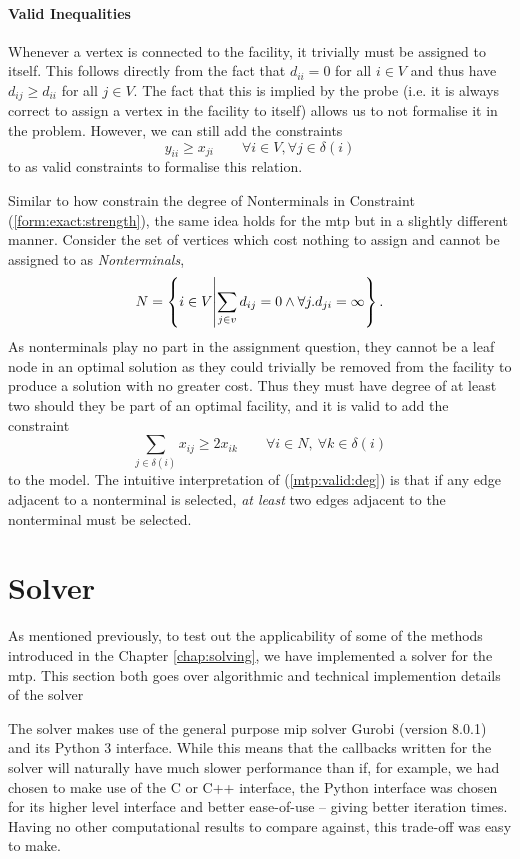  \paragraph{Valid Inequalities}
 Whenever a vertex is connected to the facility, it trivially must be assigned to itself. This
 follows directly from the fact that $d_{ii} = 0$ for all $i \in V$ and thus have $d_{ij} \geq d_{ii}$
 for all $j \in V$. The fact that this is implied by the probe (i.e. it is always correct to assign a
 vertex in the facility to itself) allows us to not formalise it in the problem. However, we can
 still add the constraints
 \begin{equation}\label{form:mtp:str}
 y_{ii} \geq x_{ji} \qquad \forall i \in V,  \forall j \in \delta(i)
\end{equation}
 to as valid constraints to formalise this relation.

 Similar to how \citeauthor{ljubic2005solving} constrain the degree of Nonterminals in Constraint
 (\ref{form:exact:strength}), the same idea holds for the \gls{mtp} but in a slightly different manner.
 Consider the set of vertices which cost nothing to assign and cannot be assigned to as \textit{Nonterminals},
 $$N = \left\{ i \in V \middle\vert \sum_{j \in v} d_{ij} = 0 \wedge  \forall j. d_{ji} = \infty\right\}\mathnormal{.}$$
 As nonterminals play no part in the assignment question, they cannot be a leaf node in an optimal solution as they could trivially
 be removed from the facility to produce a solution with no greater cost. Thus they
 must have degree of at least
 two should they be part of an optimal facility, and it is valid to add the constraint
 \begin{equation}\label{mtp:valid:deg}
   \sum_{j \in \delta(i)}x_{ij} \geq 2 x_{ik} \qquad \forall i \in N, \: \forall k \in \delta(i)
 \end{equation}
 to the model. The intuitive interpretation of (\ref{mtp:valid:deg}) is that if any edge adjacent to
 a nonterminal is selected, \textit{at least} two edges adjacent to the nonterminal must be selected.
\section{Solver}
As mentioned previously, to test out the applicability of some of the methods introduced in
the Chapter \ref{chap:solving}, we have implemented a solver for the \gls{mtp}.
This section both goes over algorithmic and technical implemention details of the solver

The solver makes use of the general purpose \gls{mip} solver
Gurobi \citep{gurobi} (version 8.0.1)
and its Python 3 interface. While this means that the callbacks written for the solver
will naturally have much slower performance than if, for example, we had chosen to make
use of the C or C++ interface, the Python interface was chosen for its higher level interface
and better ease-of-use -- giving better iteration times. Having no other computational results
to compare against, this trade-off was easy to make.

